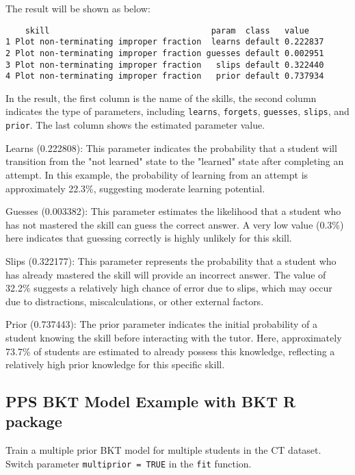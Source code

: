 \documentclass{article}
\begin{document}
The result will be shown as below: 

\begin{verbatim}
    skill                                 param  class   value
1 Plot non-terminating improper fraction  learns default 0.222837
2 Plot non-terminating improper fraction guesses default 0.002951
3 Plot non-terminating improper fraction   slips default 0.322440
4 Plot non-terminating improper fraction   prior default 0.737934
\end{verbatim}

In the result, the first column is the name of the skills, the second column indicates the type of parameters, including \texttt{learns}, \texttt{forgets}, \texttt{guesses}, \texttt{slips}, and \texttt{prior}. The last column shows the estimated parameter value.

Learns (0.222808): This parameter indicates the probability that a student will transition from the "not learned" state to the "learned" state after completing an attempt. In this example, the probability of learning from an attempt is approximately 22.3\%, suggesting moderate learning potential.

Guesses (0.003382): This parameter estimates the likelihood that a student who has not mastered the skill can guess the correct answer. A very low value (0.3\%) here indicates that guessing correctly is highly unlikely for this skill.

Slips (0.322177): This parameter represents the probability that a student who has already mastered the skill will provide an incorrect answer. The value of 32.2\% suggests a relatively high chance of error due to slips, which may occur due to distractions, miscalculations, or other external factors.

Prior (0.737443): The prior parameter indicates the initial probability of a student knowing the skill before interacting with the tutor. Here, approximately 73.7\% of students are estimated to already possess this knowledge, reflecting a relatively high prior knowledge for this specific skill.

\subsection{PPS BKT Model Example with BKT R package}

Train a multiple prior BKT model for multiple students in the CT dataset. Switch parameter \texttt{multiprior = TRUE} in the \texttt{fit} function.
\end{document}
